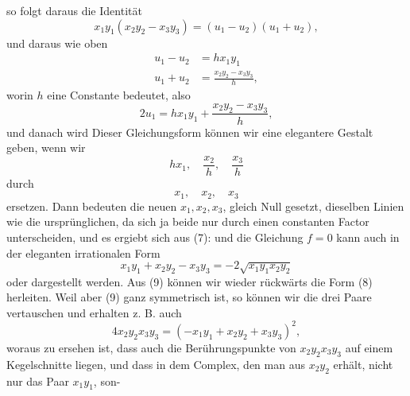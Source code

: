 so folgt daraus die Identität
\[
x_1 y_1 (x_2 y_2 - x_3 y_3) = (u_1 - u_2)(u_1 + u_2),
\]
und daraus wie oben
\[
\begin{aligned}
u_1 - u_2 &= h x_1 y_1\\
u_1 + u_2 &= \frac{x_2 y_2 - x_3 y_3}{h},
\end{aligned}
\]
worin $h$ eine Constante bedeutet, also
\[
2u_1 = h x_1 y_1 + \frac{x_2 y_2 - x_3 y_3}{h},
\]
und danach wird
Dieser Gleichungsform können wir eine elegantere Gestalt geben, wenn wir
\[
h x_1,\quad \frac{x_2}{h},\quad \frac{x_3}{h}
\]
durch
\[
x_1,\quad x_2,\quad x_3
\]
ersetzen. Dann bedeuten die neuen $x_1, x_2, x_3$, gleich Null gesetzt, dieselben Linien wie die ursprünglichen, da sich ja beide nur durch einen constanten Factor unterscheiden, und es ergiebt sich aus (7):
und die Gleichung $f = 0$ kann auch in der eleganten irrationalen Form
\[
x_1 y_1 + x_2 y_2 - x_3 y_3 = -2\sqrt{x_1 y_1 x_2 y_2}
\]
oder
dargestellt werden. Aus (9) können wir wieder rückwärts die Form (8) herleiten. Weil aber (9) ganz symmetrisch ist, so können wir die drei Paare vertauschen und erhalten z. B. auch
\[
4 x_2 y_2 x_3 y_3 = (-x_1 y_1 + x_2 y_2 + x_3 y_3)^2,
\]
woraus zu ersehen ist, dass auch die Berührungspunkte von $x_2 y_2 x_3 y_3$ auf einem Kegelschnitte liegen, und dass in dem Complex, den man aus $x_2 y_2$ erhält, nicht nur das Paar $x_1 y_1$, son-
